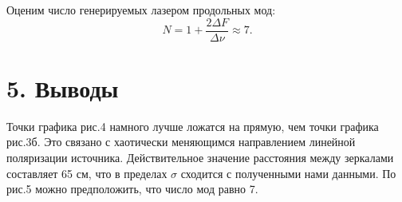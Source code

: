 \documentclass[a4paper,12pt]{report}
\begin{document}
Оценим число генерируемых лазером продольных мод:
		\begin{equation}
		N = 1 + \frac{2\Delta F }{\Delta\nu} \approx 7.
		\end{equation}

\section*{5. Выводы}
	Точки графика рис.4 намного лучше ложатся на прямую, чем точки графика рис.3б. Это связано с хаотически меняющимся направлением линейной поляризации источника. Действительное значение расстояния между зеркалами составляет 65 см, что в пределах $\sigma$ сходится с полученными нами данными. По рис.5 можно предположить, что число мод равно 7.
	
\end{document}
